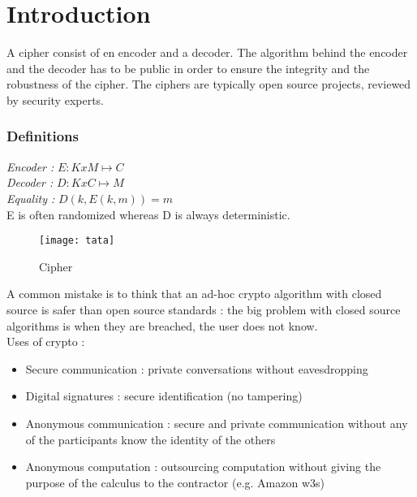 

\chapter{Introduction}



\noi A cipher consist of en encoder and a decoder. The algorithm behind the encoder and the decoder has to be public in order to ensure the integrity and the robustness of the cipher. The ciphers are typically  open source projects, reviewed by security experts.  \\

\subsection{Definitions}

\emph{Encoder : } $E : KxM \mapsto C$ \\
\emph{Decoder : } $D : KxC \mapsto M$ \\

\emph{Equality : } $ D(k, E(k,m) ) = m $ \\

E is often randomized whereas D is always deterministic.

\begin{figure}[ht!]
	\centering
		\texttt{[image: tata]}
	\caption{Cipher}
	\label{fig:Cipher}
\end{figure}

\noi A common mistake is to think that an ad-hoc crypto algorithm with closed source is safer than open source standards : the big problem with closed source algorithms is when they are breached, the user does not know.\\


\noi Uses of crypto : 
\begin{itemize}
		\item Secure communication : private conversations without eavesdropping 
		\item Digital signatures : secure identification (no tampering)
		\item Anonymous communication : secure and private communication without any of the participants know the identity of the others  
		\item Anonymous computation : outsourcing computation without giving the purpose of the calculus to the contractor (e.g. Amazon w3s)\\
\end{itemize}


